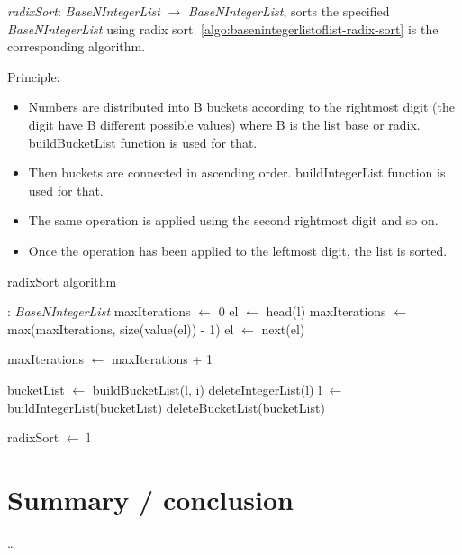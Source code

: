 \documentclass[book, nodocumentinfo]{upmethodology-document}
\begin{document}
\emph{radixSort}: \emph{BaseNIntegerList} \(\rightarrow\) \emph{BaseNIntegerList},
sorts the specified \emph{BaseNIntegerList} using radix sort.
\ref{algo:basenintegerlistoflist-radix-sort} is the corresponding algorithm.

Principle:
\begin{itemize}
    \item Numbers are distributed into B buckets according to the rightmost
        digit (the digit have B different possible values)
        where B is the list base or radix.
        buildBucketList function is used for that.
    \item Then buckets are connected in ascending order.
        buildIntegerList function is used for that.
    \item The same operation is applied using the second rightmost digit and so on.
    \item Once the operation has been applied to the leftmost digit, the list is sorted.
\end{itemize}

\begin{algorithm}[H]
    \caption{radixSort algorithm}
    \label{algo:basenintegerlistoflist-radix-sort}

    \begin{algorithmic}
         : \emph{BaseNIntegerList}
            \State maxIterations \(\leftarrow\) 0
            \State el \(\leftarrow\) head(l)
                \State maxIterations \(\leftarrow\) max(maxIterations, size(value(el)) - 1)
                \State el \(\leftarrow\) next(el)
            \EndWhile

            \State maxIterations \(\leftarrow\) maxIterations + 1

                \State bucketList \(\leftarrow\) buildBucketList(l, i)
                \State deleteIntegerList(l)
                \State l \(\leftarrow\) buildIntegerList(bucketList)
                \State deleteBucketList(bucketList)
            \EndFor

            \State radixSort \(\leftarrow\) l
        \EndFunction
    \end{algorithmic}
\end{algorithm}

\chapter{Summary / conclusion}

…
\end{document}
